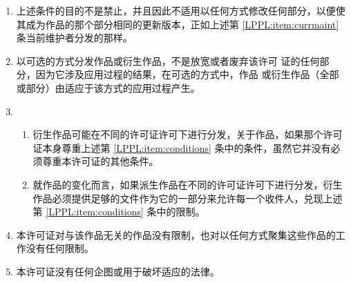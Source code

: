 \begin{LPPLicense}
\begin{enumerate}
        \item 上述条件的目的不是禁止，并且因此不适用以任何方式修改任何部分，以便使其成为作品的那个部分相同的更新版本，正如上述第 \ref{LPPL:item:currmaint} 条当前维护者分发的那样。
        \item 以可选的方式分发作品或衍生作品，不是放宽或者废弃该许可 证的任何部分，因为它涉及应用过程的结果，在可选的方式中，作品 或衍生作品（全部或部分）由适应于该方式的应用过程产生。
        \item \null
            \begin{enumerate}
                \item 衍生作品可能在不同的许可证许可下进行分发，关于作品，如果那个许可证本身尊重上述第 \ref{LPPL:item:conditions} 条中的条件，虽然它并没有必须尊重本许可证的其他条件。
                \item 就作品的变化而言，如果派生作品在不同的许可证许可下进行分发，衍生作品必须提供足够的文件作为它的一部分来允许每一个收件人，兑现上述第 \ref{LPPL:item:conditions} 条中的限制。
            \end{enumerate}
        \item 本许可证对与该作品无关的作品没有限制，也对以任何方式聚集这些作品的工作没有任何限制。
        \item 本许可证没有任何企图或用于破坏适应的法律。
    \end{enumerate}



\end{LPPLicense}
